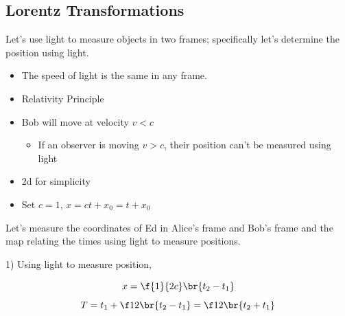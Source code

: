 \documentclass{article}
\begin{document}
\subsection{Lorentz Transformations}

Let's use light to measure objects in two frames; specifically let's determine the position using light.


\begin{itemize}
    \item The speed of light is the same in any frame.
    \item Relativity Principle
    \item Bob will move at velocity $v < c$
    \begin{itemize}
        \item If an observer is moving $v > c$, their position can't be measured using light
    \end{itemize}
    \item 2d for simplicity
    \item Set $c=1$, $x=ct + x_0 = t + x_0$
\end{itemize}

\begin{center}
\end{center}

Let's measure the coordinates of Ed in Alice's frame and Bob's frame and the map relating the times using light to measure positions.

1) Using light to measure position,

\[ x = \f{1}{2c}\br{t_2 - t_1} \]
\[ T = t_1 + \f12 \br{t_2 - t_1} = \f12 \br{t_2 + t_1} \]
\end{document}

